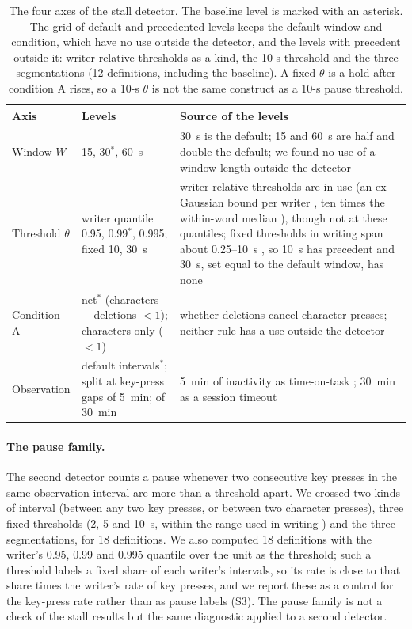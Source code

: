 \begin{table}[t]
\centering\footnotesize
\caption{The four axes of the stall detector. The baseline level is marked with an asterisk. The grid of default and
precedented levels keeps the default window and condition, which have no use outside the detector, and the levels with
precedent outside it: writer-relative thresholds as a kind, the 10-s threshold and the three segmentations (12
definitions, including the baseline). A fixed $\theta$ is a hold after condition A rises, so a 10-s $\theta$ is not the
same construct as a 10-s pause threshold.}
\label{tab:grid}
\begin{tabularx}{\textwidth}{@{}l l X@{}}
\toprule
Axis & Levels & Source of the levels \\
\midrule
Window $W$ & 15, 30$^\ast$, 60~s & 30~s is the default; 15 and 60~s are half and double the default; we found no
use of a window length outside the detector \\
Threshold $\theta$ & writer quantile 0.95, 0.99$^\ast$, 0.995; fixed 10, 30~s & writer-relative thresholds are in use
(an ex-Gaussian bound per writer \cite{chukharev2014pauses}, ten times the within-word median \cite{guo2020scenario}),
though not at these quantiles; fixed thresholds in writing span about 0.25--10~s \cite{torrance2024methods}, so 10~s
has precedent and 30~s, set equal to the default window, has none \\
Condition A & net$^\ast$ (characters $-$ deletions $< 1$); characters only ($< 1$) & whether deletions cancel character
presses; neither rule has a use outside the detector \\
Observation & default intervals$^\ast$; split at key-press gaps of 5~min; of 30~min & 5~min of inactivity as
time-on-task \cite{hart2023time}; 30~min as a session timeout \cite{halfaker2015session} \\
\bottomrule
\end{tabularx}
\end{table}

\paragraph{The pause family.} The second detector counts a pause whenever two consecutive key presses in the same
observation interval are more than a threshold apart. We crossed two kinds of interval (between any two key presses,
or between two character presses), three fixed thresholds (2, 5 and 10~s, within the range used in writing
\cite{torrance2024methods}) and the three segmentations, for 18 definitions. We also computed 18 definitions with the
writer's 0.95, 0.99 and 0.995 quantile over the unit as the threshold; such a threshold labels a fixed share of each
writer's intervals, so its rate is close to that share times the writer's rate of key presses, and we report these as
a control for the key-press rate rather than as pause labels (S3). The pause family is not a check of the stall
results but the same diagnostic applied to a second detector.

